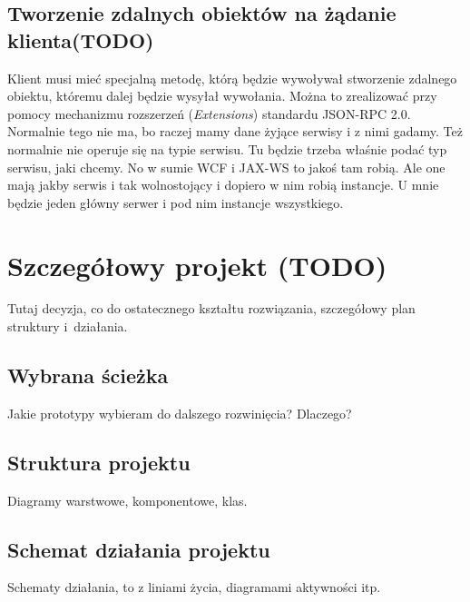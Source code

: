\subsection{Tworzenie zdalnych obiektów na żądanie klienta(TODO)}
Klient musi mieć specjalną metodę, którą będzie wywoływał stworzenie zdalnego obiektu, któremu dalej będzie wysyłał wywołania.
Można to zrealizować przy pomocy mechanizmu rozszerzeń (\emph{Extensions}) standardu JSON-RPC 2.0.
Normalnie tego nie ma, bo raczej mamy dane żyjące serwisy i z nimi gadamy. Też normalnie nie operuje się na typie serwisu. Tu będzie trzeba właśnie podać typ serwisu, jaki chcemy. No w sumie WCF i JAX-WS to jakoś tam robią. Ale one mają jakby serwis i tak wolnostojący i dopiero w nim robią instancje. U mnie będzie jeden główny serwer i pod nim instancje wszystkiego.



\section{Szczegółowy projekt (TODO)}
Tutaj decyzja, co do ostatecznego kształtu rozwiązania, szczegółowy plan struktury i~działania.

\subsection{Wybrana ścieżka}
Jakie prototypy wybieram do dalszego rozwinięcia?
Dlaczego?




\subsection{Struktura projektu}
Diagramy warstwowe, komponentowe, klas.



\subsection{Schemat działania projektu}
Schematy działania, to z liniami życia, diagramami aktywności itp.


